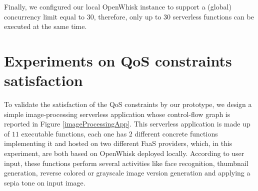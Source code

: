 \documentclass[12pt,a4paper]{report}
\begin{document}
Finally, we configured our local OpenWhisk instance to support a (global) concurrency limit equal to $30$, therefore, only up to $30$ serverless functions can be executed at the same time.

\section{Experiments on QoS constraints satisfaction}

To validate the satisfaction of the QoS constraints by our prototype, we design a simple image-processing serverless application whose control-flow graph is reported in Figure \ref{imageProcessingApp}. This serverless application is made up of $11$ executable functions, each one has $2$ different concrete functions implementing it and hosted on two different FaaS providers, which, in this experiment, are both based on OpenWhisk deployed locally. According to user input, these functions perform several activities like face recognition, thumbnail generation, reverse colored or grayscale image version generation and applying a sepia tone on input image.
\end{document}
